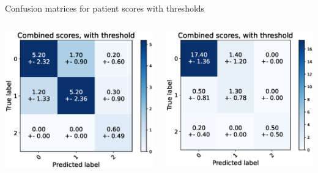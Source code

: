 \begin{frame}[fragile]{Confusion matrices for patient scores with thresholds}
\begin{columns}[T,onlytextwidth]
        \includegraphics[width=\textwidth]{files/figs/res/pelvis/cnf-combined-th.eps}

        \includegraphics[width=\textwidth]{files/figs/res/kmfp/cnf-combined-th.eps}
  \end{columns}

\end{frame}

